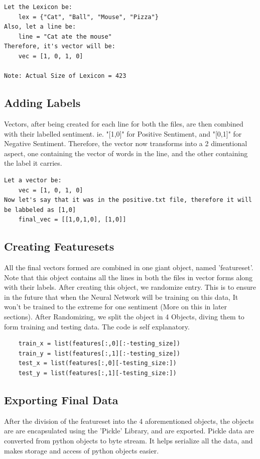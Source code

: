 \begin{verbatim}
Let the Lexicon be:
    lex = {"Cat", "Ball", "Mouse", "Pizza"}
Also, let a line be:
    line = "Cat ate the mouse"
Therefore, it's vector will be:
    vec = [1, 0, 1, 0]

Note: Actual Size of Lexicon = 423
\end{verbatim}

\subsection{Adding Labels}
Vectors, after being created for each line for both the files, are then combined with their labelled sentiment. ie. "[1,0]" for Positive Sentiment, and "[0,1]" for Negative Sentiment.
Therefore, the vector now transforms into a 2 dimentional aspect, one containing the vector of words in the line, and the other containing the label it carries.

\begin{verbatim}
Let a vector be:
    vec = [1, 0, 1, 0]
Now let's say that it was in the positive.txt file, therefore it will be labbeled as [1,0]
    final_vec = [[1,0,1,0], [1,0]]
\end{verbatim}

\subsection{Creating Featuresets}
All the final vectors formed are combined in one giant object, named 'featureset'. Note that this object contains all the lines in both the files in vector forms along with their labels.
After creating this object, we randomize entry. This is to ensure in the future that when the Neural Network will be training on this data, It won't be trained to the extreme for one sentiment (More on this in later sections).
After Randomizing, we split the object in 4 Objects, diving them to form training and testing data. The code is self explanatory.

\begin{verbatim}
    train_x = list(features[:,0][:-testing_size])
    train_y = list(features[:,1][:-testing_size])
    test_x = list(features[:,0][-testing_size:])
    test_y = list(features[:,1][-testing_size:])
\end{verbatim}

\subsection{Exporting Final Data}
After the division of the featureset into the 4 aforementioned objects, the objects are are encapsulated using the 'Pickle' Library, and are exported. Pickle data are converted from python objects to byte stream. It helps serialize all the data, and makes storage and access of python objects easier.

